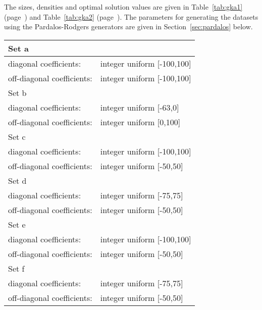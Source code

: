 \documentclass[a4paper, 12pt]{article}
\begin{document}
The sizes, densities and optimal solution values are given in
Table~\ref{tab:gka1} (page~\pageref{tab:gka1}) and
Table~\ref{tab:gka2} (page~\pageref{tab:gka2}). 
The parameters for generating the datasets using the Pardalos-Rodgers
generators are given in Section~\ref{sec:pardalos} below. 

\noindent
\begin{tabular}{ll}
\hline
Set a & \\
\hline
diagonal coefficients:  &       integer uniform [-100,100]\\
off-diagonal coefficients:&     integer uniform [-100,100]\\
\hline
\hline
Set b & \\
\hline
diagonal coefficients: &        integer uniform [-63,0]\\
off-diagonal coefficients:&     integer uniform [0,100]\\
\hline
\hline
Set c &\\
\hline
diagonal coefficients: &        integer uniform [-100,100]\\
off-diagonal coefficients: &    integer uniform [-50,50]\\
\hline
\hline
Set d &\\
\hline
diagonal coefficients: &        integer uniform [-75,75]\\
off-diagonal coefficients:&     integer uniform [-50,50]\\
\hline
\hline
Set e &\\
\hline
diagonal coefficients: &        integer uniform [-100,100]\\
off-diagonal coefficients: &    integer uniform [-50,50]\\
\hline
Set f &\\
\hline
diagonal coefficients: &        integer uniform [-75,75]\\
off-diagonal coefficients: &    integer uniform [-50,50]\\
\hline
\end{tabular}
\end{document}
